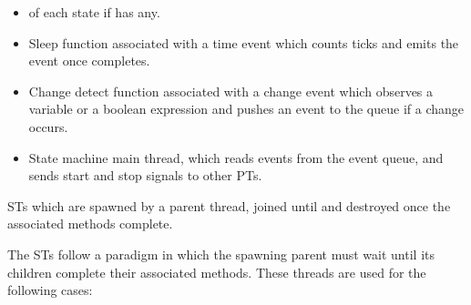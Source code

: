{
\begin{itemize}
	\setlength\itemsep{-0.25em}
	\item {} of each state if has any. %
	
	\item Sleep function associated with a time event which counts ticks and emits the event once completes.%
	
	\item Change detect function associated with a change event which observes a variable or a boolean expression and pushes an event to the queue if a change occurs.%
	
	\item State machine main thread, which reads events from the event queue, and sends start and stop signals to other PTs.
\end{itemize} 
}


STs which are spawned by a parent thread, joined until and destroyed once the associated methods complete. 

The STs follow a paradigm in which the spawning parent must wait until its children complete their associated methods. These threads are used for the following cases:

